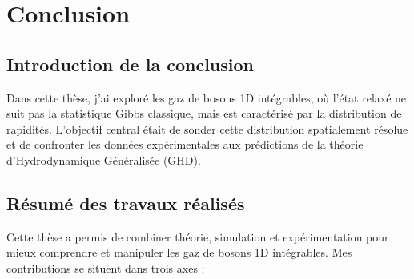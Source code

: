%
%

\chapter*{Conclusion}

\section*{Introduction de la conclusion}
Dans cette thèse, j’ai exploré les gaz de bosons 1D intégrables, où l’état relaxé ne suit pas la statistique Gibbs classique, mais est caractérisé par la distribution de rapidités. L’objectif central était de sonder cette distribution spatialement résolue et de confronter les données expérimentales aux prédictions de la théorie d’Hydrodynamique Généralisée (\gls{GHD}).

\section*{Résumé des travaux réalisés}

Cette thèse a permis de combiner théorie, simulation et expérimentation pour mieux comprendre et manipuler les gaz de bosons 1D intégrables. Mes contributions se situent dans trois axes :

